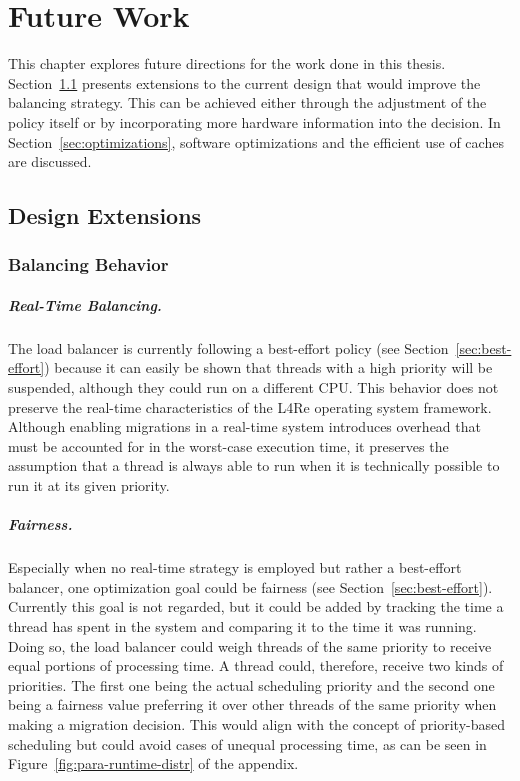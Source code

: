 \chapter{Future Work}
\label{sec:futurework}

This chapter explores future directions for the work done in this thesis.
Section~\ref{sec:design-extensions} presents extensions to the current design that would improve the balancing strategy.
This can be achieved either through the adjustment of the policy itself or by incorporating more hardware information into the decision.
In Section~\ref{sec:optimizations}, software optimizations and the efficient use of caches are discussed.

\section{Design Extensions}
\label{sec:design-extensions}

\subsection{Balancing Behavior}

\paragraph{Real-Time Balancing.}

The load balancer is currently following a best-effort policy (see Section~\ref{sec:best-effort}) because it can easily be shown that threads with a high priority will be suspended, although they could run on a different CPU.
This behavior does not preserve the real-time characteristics of the L4Re operating system framework.
Although enabling migrations in a real-time system introduces overhead that must be accounted for in the worst-case execution time, it preserves the assumption that a thread is always able to run when it is technically possible to run it at its given priority.

\paragraph{Fairness.}

Especially when no real-time strategy is employed but rather a best-effort balancer, one optimization goal could be fairness (see Section~\ref{sec:best-effort}).
Currently this goal is not regarded, but it could be added by tracking the time a thread has spent in the system and comparing it to the time it was running.
Doing so, the load balancer could weigh threads of the same priority to receive equal portions of processing time.
A thread could, therefore, receive two kinds of priorities.
The first one being the actual scheduling priority and the second one being a fairness value preferring it over other threads of the same priority when making a migration decision.
This would align with the concept of priority-based scheduling but could avoid cases of unequal processing time, as can be seen in Figure~\ref{fig:para-runtime-distr} of the appendix.

